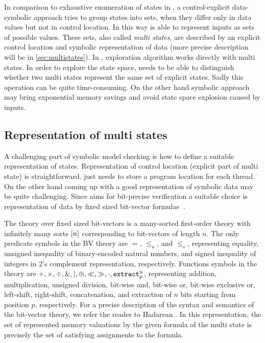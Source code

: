 In comparison to exhaustive enumeration of states in \DIVINE, a control-explicit
data-symbolic approach tries to group states into sets, when they differ only in
data values but not in control location. In this way \SymDIVINE is able to
represent inputs as sets of possible values. These sets, also called \emph{multi
states}, are described by an explicit control location and symbolic
representation of data (more precise description will be in
\autoref{sec:multistates}). In \SymDIVINE, exploration algorithm works directly
with multi states. In order to explore the state space, \SymDIVINE needs to be
able to distinguish whether two multi states represent the same set of explicit
states. Sadly this operation can be quite time-consuming. On the other hand
symbolic approach may bring exponential memory savings and avoid state space
explosion caused by inputs.

\subsection{Representation of multi states} \label{sec:multistates}

A challenging part of symbolic model checking is how to define a suitable
representation of states. Representation of control location (explicit part of
multi state) is straightforward. \SymDIVINE just needs to store
a program location for each thread. On the other hand coming up with a good
representation of symbolic data may be quite challenging. Since \SymDIVINE aims
for bit-precise verification a suitable choice is representation of data
by fixed sized bit-vector formulae~\cite{Bauch14}.

The theory over fixed sized bit-vectors is a many-sorted first-order theory with
infinitely many sorts $[n]$ corresponding to bit-vectors of length $n$. The
only predicate symbols in the BV theory are $=$, $\leq_u$, and $\leq_s$,
representing equality, unsigned inequality of binary-encoded natural numbers,
and signed inequality of integers in $2$'s complement representation,
respectively. Functions symbols in the theory are $+, \times, \div, \&, \mid,
\oplus, \ll, \gg, \cdot, \texttt{extract}^{n}_{p}$, representing addition, multiplication,
unsigned division, bit-wise and, bit-wise or, bit-wise exclusive or, left-shift,
right-shift, concatenation, and extraction of $n$ bits starting from position
$p$, respectively. For a precise description of the syntax and semantics of the
bit-vector theory, we refer the reader to Hadarean \cite{Hadarean14}. In this
representation, the set of represented memory valuations by the given formula of
the multi state is precisely the set of satisfying assignments to the formula.

